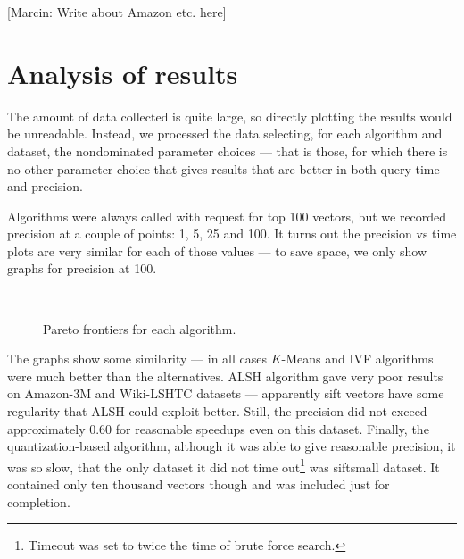 [Marcin: Write about Amazon etc. here]



\section{Analysis of results}

The amount of data collected is quite large, so directly plotting the results would be
unreadable. Instead, we processed the data selecting, for each algorithm and dataset,
the nondominated parameter choices --- that is those, for which there is no other
parameter choice that gives results that are better in both query time and precision.

Algorithms were always called with request for top 100 vectors, but we recorded
precision at a couple of points: 1, 5, 25 and 100. It turns out the precision vs time
plots are very similar for each of those values --- to save space, we only show
graphs for precision at 100.

\begin{figure}[H]
	\centering
	\\
\caption{Pareto frontiers for each algorithm.}
\end{figure}

The graphs show some similarity --- in all cases $K$-Means and IVF algorithms were much better
than the alternatives. ALSH algorithm gave very poor results on Amazon-3M and Wiki-LSHTC
datasets --- apparently sift vectors have some regularity that ALSH could exploit better.
Still, the precision did not exceed approximately $0.60$ for reasonable speedups even on
this dataset. Finally, the quantization-based algorithm, although it was able to give
reasonable precision, it was so slow, that the only dataset it did not time 
out\footnote{Timeout was set to twice the time of brute force search.}
was siftsmall dataset. It contained only ten thousand vectors though and was included
just for completion.

